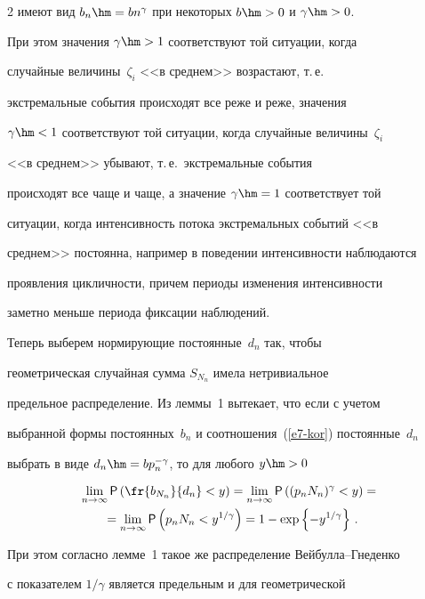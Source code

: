 \begin{multicols}{2}
имеют вид $b_n\hm=bn^{\gamma}$ при некоторых $b\hm>0$ и $\gamma\hm>0$.


При этом значения $\gamma\hm>1$ соответствуют той ситуации, когда


случайные величины~$\zeta_i$ <<в среднем>> возрастают, т.\,е.\


экстремальные события происходят все реже и реже, значения


$\gamma\hm<1$ соответствуют той ситуации, когда случайные величины~$\zeta_i$ 


<<в среднем>> убывают, т.\,е.\ экстремальные события


происходят все чаще и чаще, а значение $\gamma\hm=1$ соответствует той


ситуации, когда интенсивность потока экстремальных событий <<в


среднем>> постоянна, например в поведении интенсивности наблюдаются


проявления цикличности, причем периоды изменения интенсивности


заметно меньше периода фиксации наблюдений.





Теперь выберем нормирующие постоянные~$d_n$ так, чтобы


геометрическая случайная сумма $S_{N_n}$ имела нетривиальное


предельное распределение. Из леммы~1 вытекает, что если с учетом


выбранной формы постоянных~$b_n$ и соотношения~(\ref{e7-kor}) постоянные~$d_n$


выбрать в виде $d_n\hm=bp_n^{-\gamma}$, то для любого $y\hm>0$


\begin{multline*}


\lim\limits_{n\to\infty}{\sf P}\left(\fr{b_{N_n}}{d_n}<y\right)=


\lim\limits_{n\to\infty}{\sf P}\left((p_nN_n)^{\gamma}<y\right)={}\\


{}=


\lim\limits_{n\to\infty}{\sf P}\left(p_nN_n<y^{1/\gamma}\right)=


1-\exp\left\{-y^{1/\gamma}\right\}\,.


\end{multline*}


При этом согласно лемме~1 такое же распределение Вей\-бул\-ла--Гне\-ден\-ко


с показателем $1/\gamma$ является предельным и для геометрической



\end{multicols}
